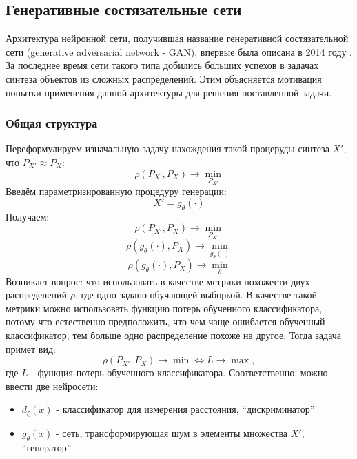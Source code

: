 	\subsection{Генеративные состязательные сети}
		Архитектура нейронной сети, получившая название генеративной состязательной сети (generative adversarial network - GAN), впервые была описана в 2014 году \cite{GAN-original}. За последнее время сети такого типа добились больших успехов в задачах синтеза объектов из сложных распределений. Этим объясняется мотивация попытки применения данной архитектуры для решения поставленной задачи.
		\subsubsection{Общая структура}
			Переформулируем изначальную задачу нахождения такой процеруды синтеза $X'$, что $ P_{X'} \approx P_X$:
			$$ \rho(P_{X'}, P_X) \longrightarrow \underset{P_{X'}}{\min} $$
			Введём параметризированную процедуру генерации:
			$$ X' = g_{\theta}(\cdot) $$
			Получаем:
			$$ \rho(P_{X'}, P_X) \longrightarrow \underset{P_{X'}}{\min} $$
			$$ \rho(g_{\theta}(\cdot), P_X) \longrightarrow \underset{g_{\theta}(\cdot)}{\min} $$
			$$ \rho(g_{\theta}(\cdot), P_X) \longrightarrow \underset{\theta}{\min} $$
			Возникает вопрос: что использовать в качестве метрики похожести двух распределений $\rho$, где одно задано обучающей выборкой.
			В качестве такой метрики можно использовать функцию потерь обученного классификатора, потому что естественно предположить, что чем чаще ошибается обученный классификатор, тем больше одно распределение похоже на другое. Тогда задача примет вид:
			$$ \rho(P_{X'}, P_X) \longrightarrow \min \Leftrightarrow L \longrightarrow \max, $$
			где $L$ - функция потерь обученного классификатора.
			Соответственно, можно ввести две нейросети:
	
			\begin{itemize}
				\item $d_{\zeta}(x)$ - классификатор для измерения расстояния, ``дискриминатор''
				\item $g_{\theta}(x)$ - сеть, трансформирующая шум в элементы множества $X'$, ``генератор''
			\end{itemize}
	
